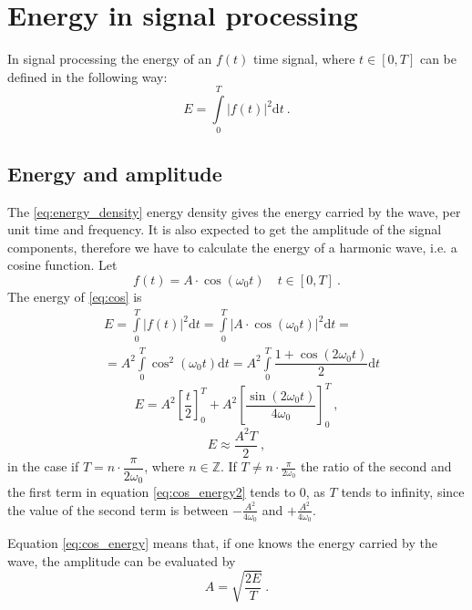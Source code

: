 \documentclass[a4paper,12pt,oneside]{article}
\newcommand{\dt}{\mathrm{d}t}
\begin{document}
\section{Energy in signal processing}

In signal processing the energy of an $f(t)$ time signal, where $t\in[0,T]$ can be defined in the following way:
\begin{equation}\label{eq:energy}
  E = \int\limits_0^T |f(t)|^2 \dt \ .
\end{equation}

\subsection{Energy and amplitude}

The \eqref{eq:energy_density} energy density gives the energy carried by the wave, per unit time and frequency. It is also expected to get the amplitude of the signal components, therefore we have to calculate the energy of a harmonic wave, i.e. a cosine function. Let
\begin{equation}\label{eq:cos}
  f(t) = A \cdot \cos(\omega_0 t) \quad t \in[0, T] \ .
\end{equation}
The energy of \eqref{eq:cos} is
\begin{eqnarray}\label{eq:cos_energy}
  & E = \int\limits_0^T |f(t)|^2 \dt = \int\limits_0^T |A \cdot \cos(\omega_0 t)|^2 \dt = \nonumber\\
  & = A^2 \int\limits_0^T \cos^2(\omega_0 t) \dt = A^2 \int\limits_0^T \dfrac{1 + \cos(2\omega_0 t)}{2} \dt
\end{eqnarray}
\begin{equation}\label{eq:cos_energy2}
  E = A^2 \left[\dfrac{t}{2}\right]_0^T + A^2 \left[\dfrac{\sin(2\omega_0 t)}{4\omega_0}\right]_0^T\ , 
\end{equation}
\begin{equation}\label{eq:cos_energy3}
  E \approx \dfrac{A^2 T}{2} \ ,
\end{equation}
in the case if $T = n\cdot \dfrac{\pi}{2\omega_0}$, where $n \in \mathbb{Z}$. If $T \neq n\cdot \frac{\pi}{2\omega_0}$ the ratio of the second and the first term in equation \eqref{eq:cos_energy2} tends to $0$, as $T$ tends to infinity, since the value of the second term is between $-\frac{A^2}{4 \omega_0}$ and $+\frac{A^2}{4 \omega_0}$.

Equation \eqref{eq:cos_energy} means that, if one knows the energy carried by the wave, the amplitude can be evaluated by
\begin{equation}\label{eq:amplitude}
  A = \sqrt{\dfrac{2 E}{T}} \ .
\end{equation}
\end{document}
